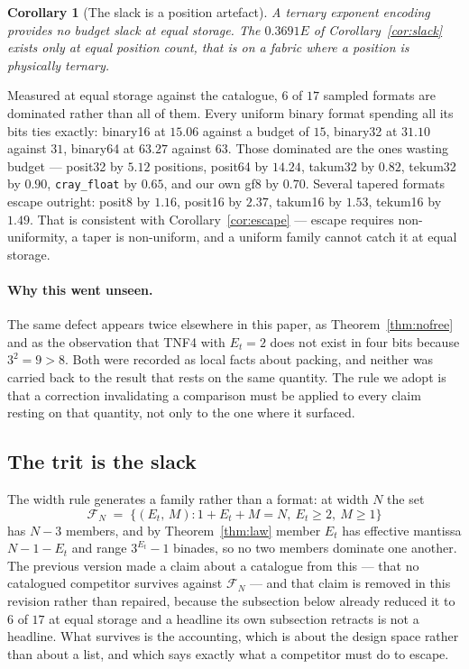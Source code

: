 \documentclass[11pt]{article}
\newtheorem{corollary}{Corollary}
\theoremstyle{definition}
\begin{document}
\begin{corollary}[The slack is a position artefact]
\label{cor:slackartefact}
A ternary exponent encoding provides no budget slack at equal storage. The
$0.3691E$ of Corollary~\ref{cor:slack} exists only at equal \emph{position}
count, that is on a fabric where a position is physically ternary.
\end{corollary}

Measured at equal storage against the catalogue, $6$ of $17$ sampled formats are
dominated rather than all of them. Every uniform binary format spending all its
bits ties exactly: binary16 at $15.06$ against a budget of $15$, binary32 at
$31.10$ against $31$, binary64 at $63.27$ against $63$. Those dominated are the
ones wasting budget --- posit32 by $5.12$ positions, posit64 by $14.24$, takum32
by $0.82$, tekum32 by $0.90$, \texttt{cray\_float} by $0.65$, and our own gf8 by
$0.70$. Several tapered formats escape outright: posit8 by $1.16$, posit16 by
$2.37$, takum16 by $1.53$, tekum16 by $1.49$. That is consistent with
Corollary~\ref{cor:escape} --- escape requires non-uniformity, a taper is
non-uniform, and a uniform family cannot catch it at equal storage.

\paragraph{Why this went unseen.} The same defect appears twice elsewhere in this
paper, as Theorem~\ref{thm:nofree} and as the observation that TNF4 with $E_t=2$
does not exist in four bits because $3^{2}=9>8$. Both were recorded as local
facts about packing, and neither was carried back to the result that rests on the
same quantity. The rule we adopt is that a correction invalidating a comparison
must be applied to every claim resting on that quantity, not only to the one
where it surfaced.


\subsection{The trit is the slack}
\label{sec:slack}

The width rule generates a family rather than a format: at width $N$ the set
\[
  \mathcal{F}_N \;=\; \{(E_t,\, M) : 1 + E_t + M = N,\ E_t \geq 2,\ M \geq 1\}
\]
has $N-3$ members, and by Theorem~\ref{thm:law} member $E_t$ has effective
mantissa $N-1-E_t$ and range $3^{E_t}-1$ binades, so no two members dominate one
another. The previous version made a claim about a catalogue from this --- that
no catalogued competitor survives against $\mathcal{F}_N$ --- and that claim is
removed in this revision rather than repaired, because the subsection below
already reduced it to $6$ of $17$ at equal storage and a headline its own
subsection retracts is not a headline. What survives is the accounting, which is
about the design space rather than about a list, and which says exactly what a
competitor must do to escape.
\end{document}
